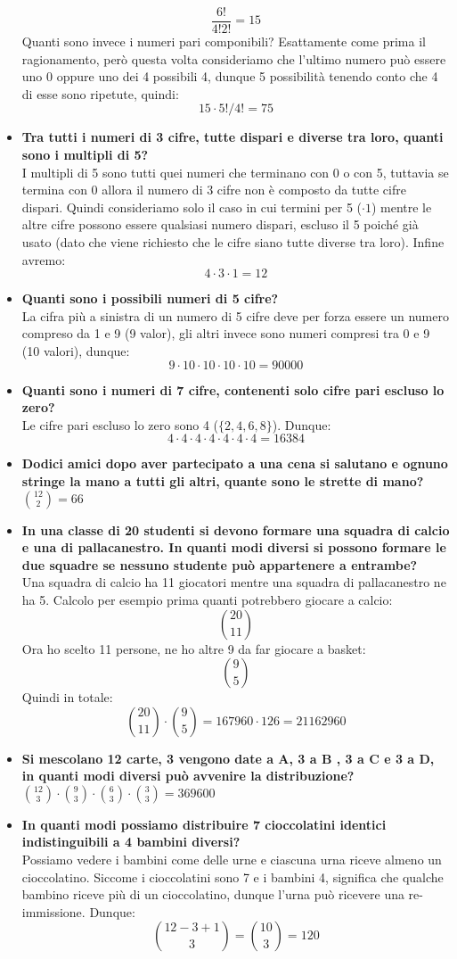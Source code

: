 \documentclass[11pt]{report}
\begin{document}
\begin{itemize}
	$$\frac{6!}{4!2!} = 15$$
	Quanti sono invece i numeri pari componibili? Esattamente come prima il ragionamento, però questa volta consideriamo che l'ultimo numero può essere uno 0 oppure uno dei 4 possibili 4, dunque 5 possibilità tenendo conto che 4 di esse sono ripetute, quindi:
	$$15 \cdot 5!/4! = 75$$
	\item \textbf{Tra tutti i  numeri di 3 cifre, tutte dispari e diverse tra loro, quanti sono i multipli di 5?}\\
	I multipli di 5 sono tutti quei numeri che terminano con 0 o con 5, tuttavia se termina con 0 allora il numero di 3 cifre non è composto da tutte cifre dispari. Quindi consideriamo solo il caso in cui termini per 5 ($\cdot 1$) mentre le altre cifre possono essere qualsiasi numero dispari, escluso il 5 poiché già usato (dato che viene richiesto che le cifre siano tutte diverse tra loro). Infine avremo:
	$$4 \cdot 3 \cdot 1 = 12$$
	\item \textbf{Quanti sono i possibili numeri di 5 cifre?}\\
	La cifra più a sinistra di un numero di 5 cifre deve per forza essere un numero compreso da 1 e 9 (9 valor), gli altri invece sono numeri compresi tra 0 e 9 (10 valori), dunque:
	$$9 \cdot 10 \cdot 10 \cdot 10 \cdot 10 = 90000$$
	\item \textbf{Quanti sono i numeri di 7 cifre, contenenti solo cifre pari escluso lo zero?}\\
	Le cifre pari escluso lo zero sono 4 ($\{2,4,6,8\}$). Dunque:
	$$4 \cdot 4 \cdot 4 \cdot 4 \cdot 4 \cdot 4 \cdot 4 = 16384$$
	\item \textbf{Dodici amici dopo aver partecipato a una cena si salutano e ognuno stringe la mano a tutti gli altri, quante sono le strette di mano?}\\
	$\binom{12}{2} = 66$
	\item \textbf{In una classe di 20 studenti si devono formare una squadra di calcio e una di pallacanestro. In quanti modi diversi si possono formare le due squadre se nessuno studente può appartenere a entrambe?}\\
	Una squadra di calcio ha 11 giocatori mentre una squadra di pallacanestro ne ha 5. Calcolo per esempio prima quanti potrebbero giocare a calcio:
	$$\binom{20}{11}$$
	Ora ho scelto 11 persone, ne ho altre 9 da far giocare a basket:
	$$\binom{9}{5}$$
	Quindi in totale:
	$$\binom{20}{11} \cdot \binom{9}{5} = 167960 \cdot 126 = 21162960$$
	\item \textbf{Si mescolano 12 carte, 3 vengono date a A, 3 a B , 3 a C e 3 a D, in quanti modi diversi può avvenire la distribuzione?}\\
	$\binom{12}{3} \cdot \binom{9}{3} \cdot \binom{6}{3} \cdot \binom{3}{3} = 369600$
	\item \textbf{In quanti modi possiamo distribuire 7 cioccolatini identici indistinguibili a 4 bambini diversi?}\\
	Possiamo vedere i bambini come delle urne e ciascuna urna riceve almeno un cioccolatino. Siccome i cioccolatini sono 7 e i bambini 4, significa che qualche bambino riceve più di un cioccolatino, dunque l'urna può ricevere una re-immissione. Dunque:
	$$\binom{12 - 3 + 1}{3} = \binom{10}{3} = 120$$
\end{itemize}
\end{document}
